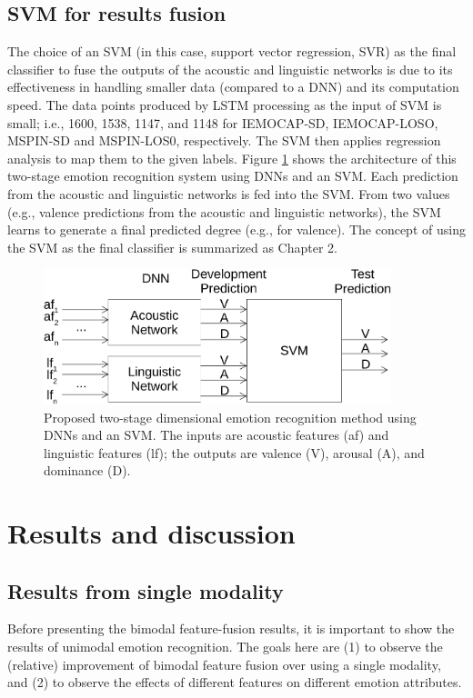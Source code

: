 \subsection{SVM for results fusion}
The choice of an SVM (in this case, support vector regression, SVR) as the
final classifier to fuse the outputs of the acoustic and linguistic networks is
due to its effectiveness in handling smaller data (compared to a DNN) and its
computation speed. The data points produced by LSTM processing as the input of
SVM is small; i.e., 1600, 1538, 1147, and 1148 for IEMOCAP-SD, IEMOCAP-LOSO,
MSPIN-SD and MSPIN-LOS0, respectively. The SVM then applies regression analysis
to map them to the given labels. Figure \ref{fig:csl_system} shows the
architecture of this two-stage emotion recognition system using DNNs and an
SVM. Each prediction from the acoustic and linguistic networks is fed into the
SVM.  From two values (e.g., valence predictions from the acoustic and
linguistic networks), the SVM learns to generate a final predicted degree
(e.g., for valence). The concept of using the SVM as the final classifier is
summarized as Chapter 2.


\begin{figure}
\centering
 \includegraphics[width=0.9\textwidth]{../fig/csl_system-crop.pdf}
\caption{Proposed two-stage dimensional emotion recognition method using DNNs
and an SVM. The inputs are acoustic features (af) and linguistic features (lf);
the outputs are valence (V), arousal (A), and dominance (D).}
\label{fig:csl_system}
\end{figure}

\section{Results and discussion}
\subsection{Results from single modality}
Before presenting the bimodal feature-fusion results, it is important to show
the results of unimodal emotion recognition. The goals here are (1) to observe
the (relative) improvement of bimodal feature fusion over using a single
modality, and (2) to observe the effects of different features on different
emotion attributes.

